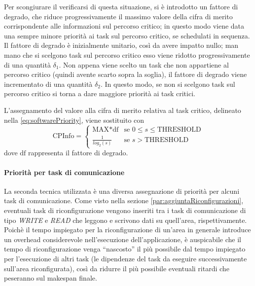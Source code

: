 Per scongiurare il verificarsi di questa situazione, si è introdotto 
un fattore di degrado, che riduce progressivamente il massimo valore della 
cifra di merito corrispondente alle informazioni sul percorso critico; in 
questo modo viene data una sempre minore priorità ai task sul percorso critico,
se schedulati in sequenza. 
Il fattore di degrado è inizialmente unitario, così da avere impatto nullo; man 
mano che si scelgono task sul percorso critico esso viene ridotto 
progressivamente di una quantità $\delta_1$. Non appena viene scelto un 
task che non appartiene al percorso critico (quindi avente scarto sopra la 
soglia), il fattore di degrado viene incrementato di una quantità $\delta_2$. 
In questo modo, se non si scelgono task sul percorso critico si torna a dare 
maggiore priorità ai task critici.

L'assegnamento del valore alla cifra di merito relativa al task critico, 
delineato nella \ref{eq:softwarePriority}, viene sostituito con
\begin{equation} \label{eq:newSoftwarePriority}
  \text{CPInfo} = \begin{cases}
    \text{MAX}*\text{df} & \mbox{se } 0 \leq s \leq \text{THRESHOLD}\\
    \frac{1}{log_2\left(s\right)} & \mbox{se } s > \text{THRESHOLD}
           \end{cases}
\end{equation}
dove $\text{df}$ rappresenta il fattore di degrado.

\paragraph{Priorità per task di comunicazione}
La seconda tecnica utilizzata è una diversa assegnazione di priorità per alcuni 
task di comunicazione. Come visto nella sezione 
\ref{par:aggiuntaRiconfigurazioni}, eventuali task di riconfigurazione vengono 
inseriti tra i task di comunicazione di tipo \emph{WRITE} e \emph{READ} che 
leggono e scrivono dati su quell'area, rispettivamente. Poichè il tempo 
impiegato per la riconfigurazione di un'area in generale introduce un 
overhead considerevole nell'esecuzione dell'applicazione, è auspicabile che 
il tempo di riconfigurazione venga ``nascosto'' il più possibile dal tempo 
impiegato per l'esecuzione di altri task (le dipendenze del task da eseguire 
successivamente sull'area riconfigurata), così da ridurre il più possibile eventuali
ritardi che peseranno sul makespan finale.

